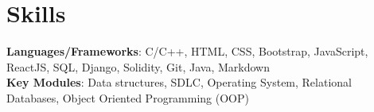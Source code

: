 \documentclass[a4,10pt]{article}
\begin{document}
\section{Skills}
\textbf{Languages/Frameworks}: C/C++, HTML, CSS, Bootstrap, JavaScript, ReactJS, SQL, Django, Solidity, Git, Java, Markdown \\ 
\textbf{Key Modules}: Data structures, SDLC, Operating System, Relational Databases, Object Oriented Programming (OOP)



\end{document}
